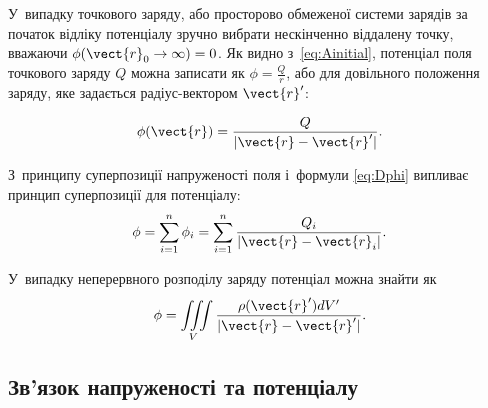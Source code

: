 У~випадку точкового заряду, або просторово обмеженої системи зарядів за початок відліку
потенціалу зручно вибрати нескінченно віддалену точку, вважаючи $\phi(\vect{r}_0 \to
	\infty) = 0$. Як видно з~\eqref{eq:Ainitial}, потенціал поля точкового заряду $Q$ можна
записати як $\phi = \frac{Q}{r}$, або для довільного положення заряду, яке задається
радіус-вектором $\vect{r}'$:

\begin{equation}
	\phi(\vect{r}) = \frac{Q}{|\vect{r} - \vect{r}'|}.
\end{equation}

З~принципу суперпозиції напруженості поля і~формули \eqref{eq:Dphi} випливає принцип
суперпозиції для потенціалу:
\begin{equation}
	\phi = \sum_{i = 1}^{n} \phi_i = \sum_{i = 1}^{n} \frac{Q_i}{|\vect{r} - \vect{r}_i|}.
\end{equation}

У~випадку неперервного розподілу заряду потенціал можна знайти як
\begin{equation}
	\phi = \iiint\limits_V \frac{\rho(\vect{r}') dV'}{|\vect{r} - \vect{r}'|}.
\end{equation}



\subsection*{Зв'язок напруженості та потенціалу}



